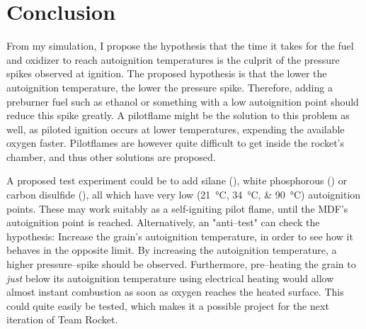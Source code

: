 \chapter{Conclusion}

From my simulation, I propose the hypothesis that the time it takes for the fuel and oxidizer to reach autoignition temperatures is the culprit of the pressure spikes observed at ignition. The proposed hypothesis is that the lower the autoignition temperature, the lower the pressure spike. Therefore, adding a preburner fuel such as ethanol or something with a low autoignition point should reduce this spike greatly. A pilotflame might be the solution to this problem as well, as piloted ignition occurs at lower temperatures, expending the available oxygen faster. Pilotflames are however quite difficult to get inside the rocket's chamber, and thus other solutions are proposed.

A proposed test experiment could be to add silane (), white phosphorous () or carbon disulfide (), all which have very low (\SIlist{21;34;90}{\celsius}) autoignition points. These may work suitably as a self-igniting pilot flame, until the MDF's autoignition point is reached.
Alternatively, an "anti--test" can check the hypothesis: Increase the grain's autoignition temperature, in order to see how it behaves in the opposite limit. By increasing the autoignition temperature, a higher pressure--spike should be observed. Furthermore, pre--heating the grain to \emph{just} below its autoignition temperature using electrical heating would allow almost instant combustion as soon as oxygen reaches the heated surface. This could quite easily be tested, which makes it a possible project for the next iteration of Team Rocket.

